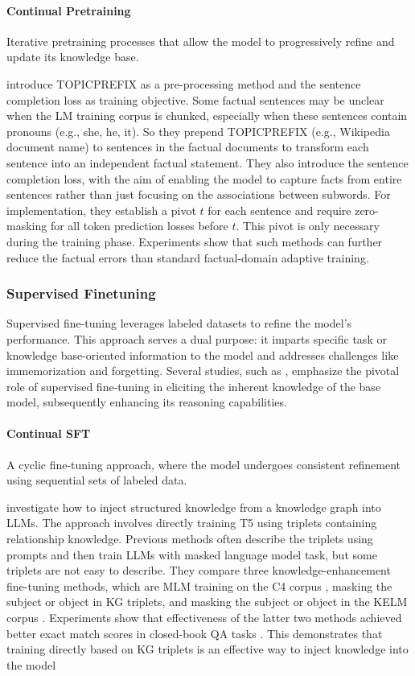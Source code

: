 \paragraph{\textbf{Continual Pretraining}}
Iterative pretraining processes that allow the model to progressively refine and update its knowledge base.

\citet{lee2022factuality} introduce TOPICPREFIX as a pre-processing method and the sentence completion loss as training objective. Some factual sentences may be unclear when the LM training corpus is chunked, especially when these sentences contain pronouns (e.g., she, he, it). So they prepend TOPICPREFIX (e.g., Wikipedia document name) to sentences in the factual documents to transform each sentence into an independent factual statement. They also introduce the sentence completion loss, with the aim of enabling the model to capture facts from entire sentences rather than just focusing on the associations between subwords. For implementation, they establish a pivot $t$ for each sentence and require zero-masking for all token prediction losses before $t$. This pivot is only necessary during the training phase. Experiments show that such methods can further reduce the factual errors than standard factual-domain adaptive training.


\subsubsection{Supervised Finetuning}
\label{sec:enhace_pure_sft}

Supervised fine-tuning leverages labeled datasets to refine the model's performance. This approach serves a dual purpose: it imparts specific task or knowledge base-oriented information to the model and addresses challenges like immemorization and forgetting. Several studies, such as \citet{chung2022scaling,LIMA}, emphasize the pivotal role of supervised fine-tuning in eliciting the inherent knowledge of the base model, subsequently enhancing its reasoning capabilities.

\paragraph{\textbf{Continual SFT}}
A cyclic fine-tuning approach, where the model undergoes consistent refinement using sequential sets of labeled data.

\citet{moiseev-etal-2022-skill} investigate how to inject structured knowledge from a knowledge graph into LLMs. The approach involves directly training T5 using triplets containing relationship knowledge. Previous methods often describe the triplets using prompts and then train LLMs with masked language model task, but some triplets are not easy to describe. They compare three knowledge-enhancement fine-tuning methods, which are MLM training on the C4 corpus \citep{C4}, masking the subject or object in KG triplets, and masking the subject or object in the KELM corpus \citep{KELM}. Experiments show that effectiveness of the latter two methods achieved better exact match scores in closed-book QA tasks \citep{jiang-etal-2019-freebaseqa, wikihop, TQ, NQ}. This demonstrates that training directly based on KG triplets is an effective way to inject knowledge into the model

